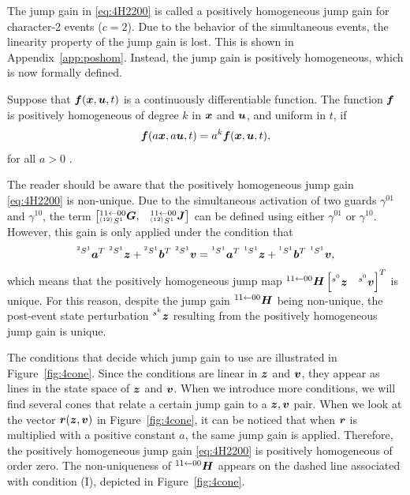 \documentclass[../DC2017114Bouma.tex]{subfiles}
\begin{document}
The jump gain in \eqref{eq:4H2200} is called a positively homogeneous jump gain for character-2 events ($c=2$). Due to the behavior of the simultaneous events, the linearity property of the jump gain is lost. This is shown in Appendix~\ref{app:poshom}. Instead, the jump gain is positively homogeneous, which is now formally defined.
 
\begin{sloppypar}
\begin{mydef}
Suppose that ${\boldsymbol{f}}({\boldsymbol{x}},{\boldsymbol{u}},t)$ is a continuously differentiable function. The function ${\boldsymbol{f}}$ is positively homogeneous of degree $k$ in ${\boldsymbol{x}}$ and ${\boldsymbol{u}}$, and uniform in $t$, if 
\begin{align}
{\boldsymbol{f}}(a{\boldsymbol{x}},a{\boldsymbol{u}},t) = a^k{\boldsymbol{f}}({\boldsymbol{x}},{\boldsymbol{u}},t),
\end{align}
for all $a>0$ \cite{Apostol1967}.
\end{mydef}
\end{sloppypar}

The reader should be aware that the positively homogeneous jump gain \eqref{eq:4H2200} is non-unique. Due to the simultaneous activation of two guards $\gamma^{01}$ and $\gamma^{10}$, the term $\begin{bmatrix}\hspace{0cm}^{11\leftarrow 00}_{\hspace{0cm}^{(12)}S^1}{\boldsymbol{G}}, & \hspace{0cm}^{11\leftarrow 00}_{\hspace{0cm}^{(12)}S^1}{\boldsymbol{J}}\end{bmatrix}$ can be defined using either $\gamma^{01}$ or $\gamma^{10}$. However, this gain is only applied under the condition that 
\begin{align}
\hspace{0cm}^{^2 S^1}{\boldsymbol{a}}^T\ \hspace{0cm}^{^2 S^1}{\boldsymbol{z}} +\hspace{0cm}^{^2 S^1}{\boldsymbol{b}}^T\ \hspace{0cm}^{^2 S^1}{\boldsymbol{v}} = \hspace{0cm}^{^1 S^1}{\boldsymbol{a}}^T\ \hspace{0cm}^{^1 S^1}{\boldsymbol{z}} +\hspace{0cm}^{^1 S^1}{\boldsymbol{b}}^T\ \hspace{0cm}^{^1 S^1}{\boldsymbol{v}},
\end{align}
which means that the positively homogeneous jump map $\hspace{0cm}^{11\leftarrow 00}{\boldsymbol{H}}\begin{bmatrix}\hspace{0cm}^{s^0}{\boldsymbol{z}} & \hspace{0cm}^{s^0}{\boldsymbol{v}} \end{bmatrix}^T$ is unique. For this reason, despite the jump gain $\hspace{0cm}^{11\leftarrow 00}{\boldsymbol{H}}$ being non-unique, the post-event state perturbation $\hspace{0cm}^{s^k}{\boldsymbol{z}}$ resulting from the positively homogeneous jump gain is unique. 

The conditions that decide which jump gain to use are illustrated in Figure~\ref{fig:4cone}. Since the conditions are linear in ${\boldsymbol{z}}$ and ${\boldsymbol{v}}$, they appear as lines in the state space of ${\boldsymbol{z}}$ and ${\boldsymbol{v}}$. When we introduce more conditions, we will find several cones that relate a certain jump gain to a ${\boldsymbol{z}},{\boldsymbol{v}}$ pair. When we look at the vector ${\boldsymbol{r}}({\boldsymbol{z}},{\boldsymbol{v}})$ in Figure~\ref{fig:4cone}, it can be noticed that when ${\boldsymbol{r}}$ is multiplied with a positive constant $a$, the same jump gain is applied. Therefore, the positively homogeneous jump gain \eqref{eq:4H2200} is positively homogeneous of order zero. The non-uniqueness of $\hspace{0cm}^{11\leftarrow 00}{\boldsymbol{H}}$ appears on the dashed line associated with condition (I), depicted in Figure~\ref{fig:4cone}.
\end{document}
